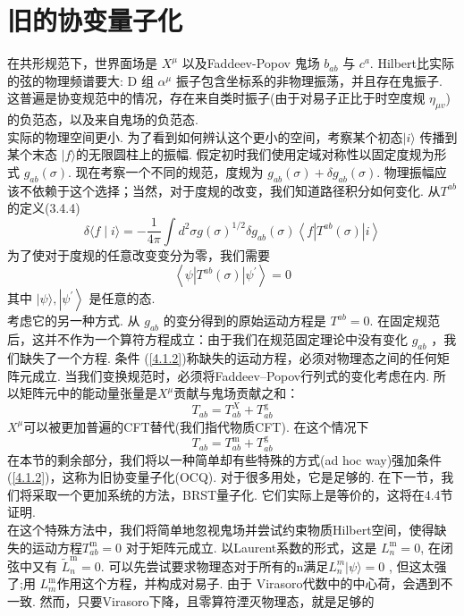 \section{旧的协变量子化}
在共形规范下，世界面场是 $X^{\mu}$ 以及Faddeev-Popov 鬼场 $b_{a b}$ 与 $c^{a} $. Hilbert比实际的弦的物理频谱要大:  D 组 $\alpha^{\mu}$ 振子包含坐标系的非物理振荡，并且存在鬼振子. 这普遍是协变规范中的情况，存在来自类时振子(由于对易子正比于时空度规 $\eta_{\mu v}$)的负范态，以及来自鬼场的负范态.\\
实际的物理空间更小. 为了看到如何辨认这个更小的空间，考察某个初态$|i\rangle$ 传播到某个末态 $|f\rangle $的无限圆柱上的振幅.  假定初时我们使用定域对称性以固定度规为形式 $g_{a b}(\sigma) $. 现在考察一个不同的规范，度规为 $g_{a b}(\sigma)+\delta g_{a b}(\sigma)$. 物理振幅应该不依赖于这个选择；当然，对于度规的改变，我们知道路径积分如何变化. 从$T^{a b}$的定义(3.4.4) 
\begin{equation}
\delta\langle f \mid i\rangle=-\frac{1}{4 \pi} \int d^{2} \sigma g(\sigma)^{1 / 2} \delta g_{a b}(\sigma)\left\langle f\left|T^{a b}(\sigma)\right| i\right\rangle
\end{equation}
为了使对于度规的任意改变变分为零，我们需要
\begin{equation}\label{4.1.2}
\left\langle\psi\left|T^{a b}(\sigma)\right| \psi^{\prime}\right\rangle=0
\end{equation}
其中 $|\psi\rangle,\left|\psi^{\prime}\right\rangle$ 是任意的态.\\
考虑它的另一种方式.  从 $g_{a b}$ 的变分得到的原始运动方程是 $T^{a b}=0 $.  在固定规范后，这并不作为一个算符方程成立：由于我们在规范固定理论中没有变化 $g_{a b}$ ，我们缺失了一个方程. 条件 (\ref{4.1.2})称缺失的运动方程，必须对物理态之间的任何矩阵元成立. 当我们变换规范时，必须将Faddeev–Popov行列式的变化考虑在内. 所以矩阵元中的能动量张量是$X^\mu$贡献与鬼场贡献之和：
\begin{equation}
T_{a b}=T_{a b}^{X}+T_{a b}^{\mathrm{g}}
\end{equation}
$X^\mu$可以被更加普遍的CFT替代(我们指代物质CFT). 在这个情况下
\begin{equation}
T_{a b}=T_{a b}^{\mathrm{m}}+T_{a b}^{\mathrm{g}}
\end{equation}
在本节的剩余部分，我们将以一种简单却有些特殊的方式(ad hoc way)强加条件(\ref{4.1.2})，这称为旧协变量子化(OCQ). 对于很多用处，它是足够的. 在下一节，我们将采取一个更加系统的方法，BRST量子化. 它们实际上是等价的，这将在4.4节证明.\\
在这个特殊方法中，我们将简单地忽视鬼场并尝试约束物质Hilbert空间，使得缺失的运动方程$T_{a b}^{\mathrm{m}}=0$ 对于矩阵元成立. 以Laurent系数的形式，这是 $L_{n}^{\mathrm{m}}=0$, 在闭弦中又有 $\tilde{L}_{n}^{\mathrm{m}}=0 $. 可以先尝试要求物理态对于所有的n满足$L_{n}^{m}|\psi\rangle=0$ , 但这太强了;用 $L_{m}^{\mathrm{m}}$作用这个方程，并构成对易子. 由于 Virasoro代数中的中心荷，会遇到不一致. 然而，只要Virasoro下降，且零算符湮灭物理态，就是足够的
